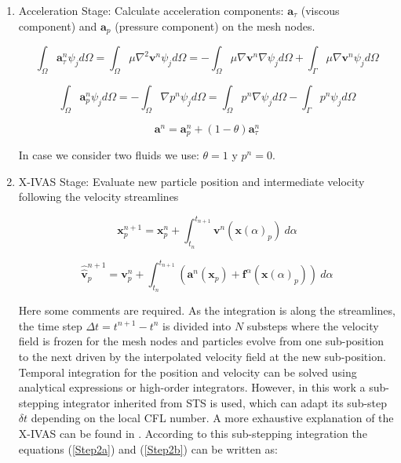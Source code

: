 \begin{enumerate}
  \item Acceleration Stage: Calculate acceleration components: $\mathbf{a}_{\tau}$ (viscous component) and $\mathbf{a}_{p}$ (pressure component) on the mesh nodes.


  \begin{equation}\label{Step1a}
\int_{\Omega}\mathbf{a}^{n}_{\tau}\psi_j d\Omega=\int_{\Omega}\mu \nabla^{2}\mathbf{v}^{n} \psi_j d\Omega=-\int_{\Omega}\mu \nabla\mathbf{v}^{n} \nabla \psi_j d\Omega + \int_{\Gamma}\mu \nabla\mathbf{v}^{n} \psi_j d\Omega
\end{equation}

\begin{equation}\label{Step1b}
\int_{\Omega}\mathbf{a}^{n}_{p}\psi_j d\Omega=-\int_{\Omega}\nabla p^{n} \psi_j d\Omega=\int_{\Omega} p^{n} \nabla \psi_j d\Omega - \int_{\Gamma} p^{n} \psi_j d\Omega
\end{equation}

\begin{equation}\label{Step1c}
\mathbf{a}^{n}=\mathbf{a}^{n}_{p} + (1-\theta)\mathbf{a}^{n}_{\tau}
\end{equation}

In case we consider two fluids we use: $\theta=1$ y $p^n=0$.

  \item X-IVAS Stage: Evaluate new particle position and intermediate velocity following the velocity streamlines

  \begin{equation}\label{Step2a}
\mathbf{x}^{n+1}_{p}=\mathbf{x}^{n}_{p} + \int_{t_n}^{t_{n+1}} \mathbf{v}^{n}(\mathbf{x}(\alpha)_{p}) \ d\alpha
\end{equation}

\begin{equation}\label{Step2b}
\widehat{\widehat{\mathbf{v}}}^{n+1}_{p}=\mathbf{v}^{n}_{p} + \int_{t_n}^{t_{n+1}} \left(\mathbf{a}^{n}(\mathbf{x}_{p}) + \mathbf{f}^{\alpha} (\mathbf{x}(\alpha)_{p})\right)  \ d\alpha
\end{equation}

Here some comments are required. As the integration is along the streamlines, the time step $\Delta t=t^{n+1}-t^{n}$ is divided into $N$ substeps where the velocity field is frozen for the mesh nodes and particles evolve from one sub-position to the next driven by the interpolated velocity field at the new sub-position. Temporal integration for the position and velocity can be solved using analytical expressions\cite{} or high-order integrators\cite{}. However, in this work a sub-stepping integrator inherited from STS\cite{} is used, which can adapt its sub-step $\delta t$ depending on the local CFL number. A more exhaustive explanation of the X-IVAS can be found in \cite{Gimenez}. According to this sub-stepping integration the equations (\ref{Step2a}) and (\ref{Step2b}) can be written as:


\end{enumerate}

